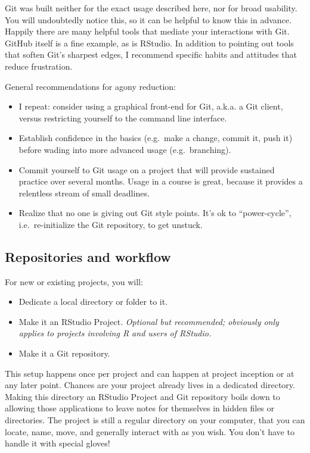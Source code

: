 \documentclass[12pt]{article}
\providecommand{\tightlist}{%
  \setlength{\itemsep}{0pt}\setlength{\parskip}{0pt}}
\begin{document}
Git was built neither for the exact usage described here, nor for broad
usability. You will undoubtedly notice this, so it can be helpful to
know this in advance. Happily there are many helpful tools that mediate
your interactions with Git. GitHub itself is a fine example, as is
RStudio. In addition to pointing out tools that soften Git's sharpest
edges, I recommend specific habits and attitudes that reduce
frustration.

General recommendations for agony reduction:

\begin{itemize}
\tightlist
\item
  I repeat: consider using a graphical front-end for Git, a.k.a. a Git
  client, versus restricting yourself to the command line interface.
\item
  Establish confidence in the basics (e.g.~make a change, commit it,
  push it) before wading into more advanced usage (e.g.~branching).
\item
  Commit yourself to Git usage on a project that will provide sustained
  practice over several months. Usage in a course is great, because it
  provides a relentless stream of small deadlines.
\item
  Realize that no one is giving out Git style points. It's ok to
  ``power-cycle'', i.e.~re-initialize the Git repository, to get
  unstuck.
\end{itemize}

\subsection{Repositories and workflow}\label{repositories-and-workflow}

For new or existing projects, you will:

\begin{itemize}
\tightlist
\item
  Dedicate a local directory or folder to it.
\item
  Make it an RStudio Project. \emph{Optional but recommended; obviously
  only applies to projects involving R and users of RStudio.}
\item
  Make it a Git repository.
\end{itemize}

This setup happens once per project and can happen at project inception
or at any later point. Chances are your project already lives in a
dedicated directory. Making this directory an RStudio Project and Git
repository boils down to allowing those applications to leave notes for
themselves in hidden files or directories. The project is still a
regular directory on your computer, that you can locate, name, move, and
generally interact with as you wish. You don't have to handle it with
special gloves!
\end{document}
